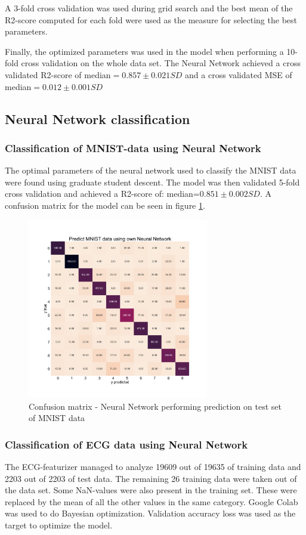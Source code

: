 \documentclass[twocolumn]{cinc}
\begin{document}
A 3-fold cross validation was used during grid search and the best mean of the R2-score computed for each fold were used as the measure for selecting the best parameters. 

Finally, the optimized parameters was used in the model when performing a 10-fold cross validation on the whole data set. The Neural Network achieved a cross validated R2-score of  median$=0.857\pm 0.021SD$ and a cross validated MSE of median$=0.012\pm 0.001SD$ 


\subsection{Neural Network classification}
\subsubsection{Classification of MNIST-data using Neural Network}
The optimal parameters of the neural network used to classify the MNIST data were found using graduate student descent. The model was then validated 5-fold cross validation and achieved a R2-score of: median=$0.851 \pm 0.002SD$. A confusion matrix for the model can be seen in figure \ref{fig:NN_mnist_confmatrix}.

\begin{figure}[htbp!]
\includegraphics[width=7.9cm]{Figures/MNIST_confMatrix_ownNN.png}
\caption{Confusion matrix - Neural Network performing prediction on test set of MNIST data}
\label{fig:NN_mnist_confmatrix}
\end{figure}



\subsubsection{Classification of ECG data using Neural Network}
The ECG-featurizer \cite{bjorn-jostein_singstad_ecg-featurizer_nodate} managed to analyze 19609 out of 19635 of training data and 2203 out of 2203 of test data. The remaining 26 training data were taken out of the data set. Some NaN-values were also present in the training set. These were replaced by the mean of all the other values in the same category. 
Google Colab was used to do Bayesian optimization. Validation accuracy loss was used as the target to optimize the model.
\end{document}

